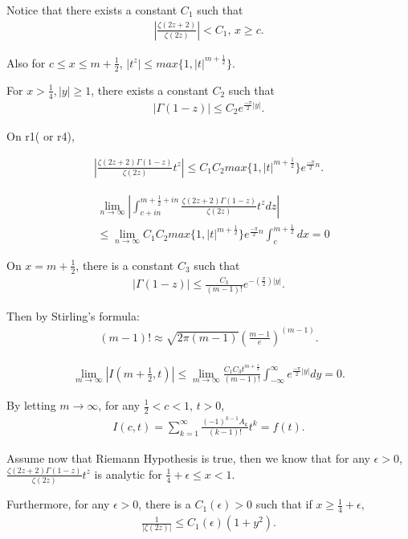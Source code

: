\documentclass{beamer}
\begin{document}
\frame
{
Notice that there exists a constant $C_1$ such that 
\begin{align*}
\left|\frac{\zeta(2z + 2)}{\zeta(2z)} \right| < C_1 \mbox{, $x \geq c$.}
\end{align*}

Also for $ c \leq x \leq m + \frac{1}{2}$, $|t^z| \leq max\{1, |t|^{m+ \frac{1}{2}} \}$.

For $x > \frac{1}{4}, |y| \geq 1$, there exists a constant $C_2$ such that 
\begin{align*}
|\Gamma(1-z)| \leq C_2 e^{\frac{-\pi}{2}|y|} .
\end{align*}
}

\frame
{
On r1( or r4), 

\begin{align*}
\left|\frac{\zeta(2z +2)\Gamma(1-z)}{\zeta(2z)}t^{z} \right| \leq C_1 C_2 max\{1, |t|^{m+ \frac{1}{2}} \} e^{\frac{-\pi}{2}n}.
\end{align*}

\begin{align*}
 &\lim_{n \rightarrow \infty} \left|\int_{c + i n}^{m+ \frac{1}{2} + i n} \frac{\zeta(2z +2)\Gamma(1-z)}{\zeta(2z)}t^{z} dz \right| \\
& \leq \lim_{n \rightarrow \infty}  C_1 C_2 max\{1, |t|^{m+ \frac{1}{2}} \} e^{\frac{-\pi}{2}n}
\int_{c }^{m+ \frac{1}{2} }  dx = 0
\end{align*}

}

\frame
{

On $x = m + \frac{1}{2}$, there is a constant $C_3$ such that  
\begin{align*}
|\Gamma(1-z)| \leq \frac{C_3}{(m-1)!} e^{-(\frac{\pi}{2})|y|}.
\end{align*}

Then by Stirling's formula: 
\begin{align*}
(m-1)! \approx \sqrt{2\pi (m-1)} (\frac{m-1}{e})^{(m-1)}.
\end{align*}

\begin{align*}
\lim_{m \rightarrow \infty} \left|I(m + \frac{1}{2}, t) \right| \leq \lim_{m \rightarrow \infty} \frac{ C_1 C_3 t^{m + \frac{1}{2}}}{(m-1)!}
\int_{- \infty}^{\infty} e^{\frac{-\pi}{2} |y|} dy = 0.
\end{align*}
}

\frame
{
By letting $m \rightarrow \infty$, for any $\frac{1}{2} < c < 1$, $ t > 0$,
\begin{align*}
I(c, t) = \sum^{\infty}_{k = 1} \frac{(-1)^{k-1}A_k}{(k-1)!}t^{k} = f(t).
\end{align*}

Assume now that Riemann Hypothesis is true, then we know that for any $\epsilon > 0$, $\frac{\zeta(2z +2)\Gamma(1-z)}{\zeta(2z)}t^{z}$ is
analytic for $\frac{1}{4} + \epsilon \leq x < 1$.

Furthermore, for any $\epsilon > 0$, there is a $C_1(\epsilon) > 0$ such
that if $x \geq \frac{1}{4} + \epsilon$,
\begin{align*}
\frac{1}{|\zeta(2z)|} \leq C_1 (\epsilon)(1+y^2) .
\end{align*}
}
\end{document}
